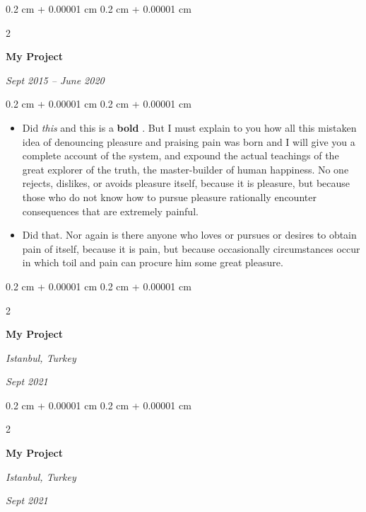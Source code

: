 \documentclass[10pt, letterpaper]{article}
\newenvironment{highlights}{
    \begin{itemize}[
        topsep=0.10 cm,
        parsep=0.10 cm,
        partopsep=0pt,
        itemsep=0pt,
        leftmargin=0.4 cm + 10pt
    ]
}{
    \end{itemize}
} %
\newenvironment{onecolentry}{
    \begin{adjustwidth}{
        0.2 cm + 0.00001 cm
    }{
        0.2 cm + 0.00001 cm
    }
}{
    \end{adjustwidth}
} %
\newenvironment{twocolentry}[2][]{
    \onecolentry
    \def\secondColumn{#2}
    \setcolumnwidth{\fill, 4.5 cm}
    \begin{paracol}{2}
}{
    \switchcolumn \raggedleft \secondColumn
    \end{paracol}
    \endonecolentry
} %
\let\hrefWithoutArrow\href
\renewcommand{\href}[2]{\hrefWithoutArrow{#1}{\ifthenelse{\equal{#2}{}}{ }{#2 }\raisebox{.15ex}{\footnotesize \faExternalLink*}}}
\begin{document}
        \vspace{0.2 cm}

        \begin{twocolentry}{
            
            
        \textit{Sept 2015 – June 2020}}
            \textbf{My Project}
        \end{twocolentry}

        \vspace{0.10 cm}
        \begin{onecolentry}
            \begin{highlights}
                \item Did \textit{this} and this is a \textbf{bold} \href{https://example.com}{link}. But I must explain to you how all this mistaken idea of denouncing pleasure and praising pain was born and I will give you a complete account of the system, and expound the actual teachings of the great explorer of the truth, the master-builder of human happiness. No one rejects, dislikes, or avoids pleasure itself, because it is pleasure, but because those who do not know how to pursue pleasure rationally encounter consequences that are extremely painful.
                \item Did that. Nor again is there anyone who loves or pursues or desires to obtain pain of itself, because it is pain, but because occasionally circumstances occur in which toil and pain can procure him some great pleasure.
            \end{highlights}
        \end{onecolentry}


        \vspace{0.2 cm}

        \begin{twocolentry}{
        \textit{Istanbul, Turkey}    
            
        \textit{Sept 2021}}
            \textbf{My Project}
        \end{twocolentry}



        \vspace{0.2 cm}

        \begin{twocolentry}{
        \textit{Istanbul, Turkey}    
            
        \textit{Sept 2021}}
            \textbf{My Project}
        \end{twocolentry}
\end{document}

